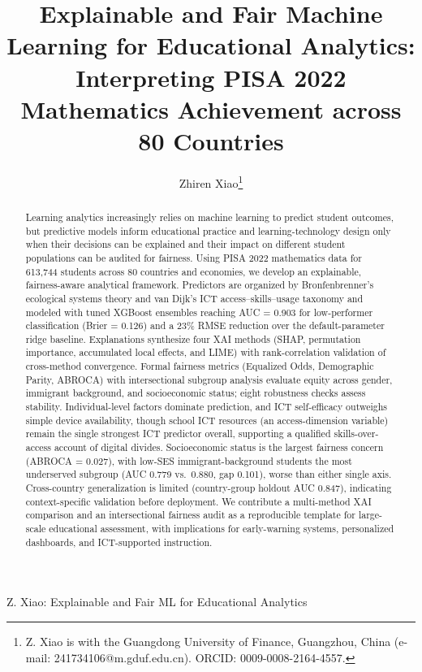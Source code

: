 \documentclass[journal]{IEEEtran}
\begin{document}
\title{Explainable and Fair Machine Learning for Educational Analytics: Interpreting PISA 2022 Mathematics Achievement across 80 Countries}

\author{Zhiren Xiao\thanks{Z. Xiao is with the Guangdong University of Finance, Guangzhou, China (e-mail: 241734106@m.gduf.edu.cn). ORCID: 0009-0008-2164-4557.}}

%
{Z. Xiao: Explainable and Fair ML for Educational Analytics}

\maketitle

\begin{abstract}
Learning analytics increasingly relies on machine learning to predict student outcomes, but predictive models inform educational practice and learning-technology design only when their decisions can be explained and their impact on different student populations can be audited for fairness. Using PISA 2022 mathematics data for 613,744 students across 80 countries and economies, we develop an explainable, fairness-aware analytical framework. Predictors are organized by Bronfenbrenner's ecological systems theory and van Dijk's ICT access--skills--usage taxonomy and modeled with tuned XGBoost ensembles reaching AUC = 0.903 for low-performer classification (Brier = 0.126) and a 23\% RMSE reduction over the default-parameter ridge baseline. Explanations synthesize four XAI methods (SHAP, permutation importance, accumulated local effects, and LIME) with rank-correlation validation of cross-method convergence. Formal fairness metrics (Equalized Odds, Demographic Parity, ABROCA) with intersectional subgroup analysis evaluate equity across gender, immigrant background, and socioeconomic status; eight robustness checks assess stability. Individual-level factors dominate prediction, and ICT self-efficacy outweighs simple device availability, though school ICT resources (an access-dimension variable) remain the single strongest ICT predictor overall, supporting a qualified skills-over-access account of digital divides. Socioeconomic status is the largest fairness concern (ABROCA = 0.027), with low-SES immigrant-background students the most underserved subgroup (AUC 0.779 vs.\ 0.880, gap 0.101), worse than either single axis. Cross-country generalization is limited (country-group holdout AUC 0.847), indicating context-specific validation before deployment. We contribute a multi-method XAI comparison and an intersectional fairness audit as a reproducible template for large-scale educational assessment, with implications for early-warning systems, personalized dashboards, and ICT-supported instruction.
\end{abstract}
\end{document}
